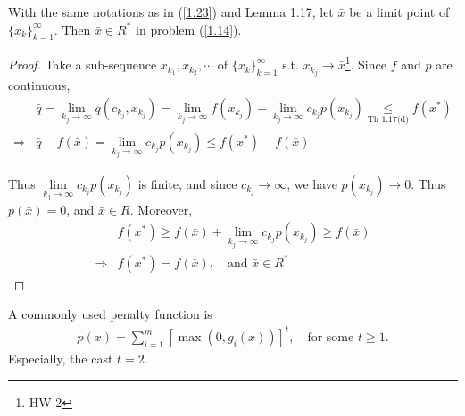 \begin{theorem}
    With the same notations as in (\ref{1.23}) and Lemma 1.17, let $\bar{x}$ be a limit point of $\{x_k\}_{k=1}^{\infty}$. Then $\bar{x}\in R^*$ in problem (\ref{1.14}). 
\end{theorem}
\begin{proof}
    Take a sub-sequence $x_{k_1}, x_{k_2}, \cdots$ of $\{x_k\}_{k=1}^{\infty}$ s.t. $x_{k_j}\to \bar{x}$\footnote{HW 2}. Since $f$ and $p$ are continuous, 
    \begin{align*}
        &\bar{q} = \lim\limits_{k_j\to \infty} q(c_{k_j}, x_{k_j}) = \lim\limits_{k_j\to\infty} f(x_{k_j}) + \lim\limits_{k_j\to\infty} c_{k_j} p(x_{k_j}) \underset{\text{Th 1.17(d)}}{\leqslant} f(x^*) \\
        \Longrightarrow & \bar{q} - f(\bar{x}) = \lim\limits_{{k_j}\to\infty} c_{k_j}p(x_{k_j}) \leqslant f(x^*) - f(\bar{x})
    \end{align*}

    Thus $\lim\limits_{k_j\to\infty} c_{k_j}p(x_{k_j})$ is finite, and since $c_{k_j}\to\infty$, we have $p(x_{k_j})\to 0$. Thus $p(\bar{x}) = 0$, and $\bar{x}\in R$. Moreover, 
    \begin{align*}
        &f(x^*) \geqslant f(\bar{x}) + \lim\limits_{k_j\to\infty} c_{k_j} p(x_{k_j}) \geqslant f(\bar{x}) \\
        \Longrightarrow & f(x^*) = f(\bar{x}), \quad \text{and } \bar{x}\in R^*
    \end{align*}
\end{proof}

A commonly used penalty function is 
\begin{align}
    p(x) = \sum\limits_{i=1}^m \left[ \max(0, g_i(x))\right]^t, \quad \text{for some } t\geqslant 1.\label{1.24}
\end{align}
Especially, the cast $t=2$.


